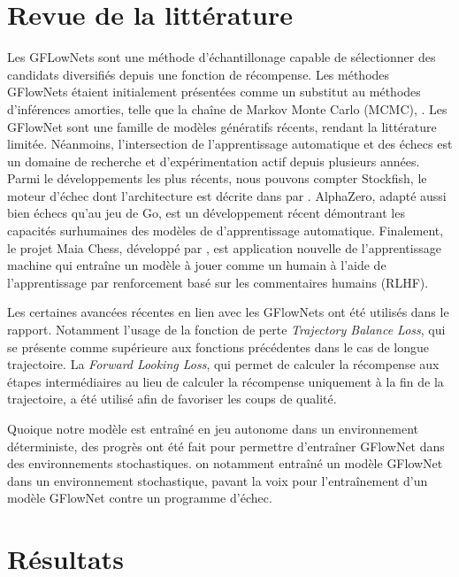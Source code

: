 \documentclass[11pt]{article}
\begin{document}
\section*{Revue de la littérature}
Les GFLowNets sont une méthode d’échantillonage capable de
sélectionner des candidats diversifiés depuis une fonction de
récompense. Les méthodes GFlowNets étaient initialement présentées
comme un substitut au méthodes d’inférences amorties, telle que la
chaîne de Markov Monte Carlo (MCMC), \cite{gflownetfoundation}. Les
GFlowNet sont une famille de modèles génératifs récents, rendant la
littérature limitée. Néanmoins, l'intersection de l'apprentissage
automatique et des échecs est un domaine de recherche et
d'expérimentation actif depuis plusieurs années. Parmi le
développements les plus récents, nous pouvons compter Stockfish, le
moteur d'échec dont l'architecture est décrite dans par
\citet{Stockfish}. AlphaZero, adapté aussi bien échecs qu'au jeu de
Go, est un développement récent démontrant les capacités surhumaines
des modèles de d'apprentissage automatique. Finalement, le projet Maia
Chess, développé par \citet{Maia}, est application nouvelle de
l'apprentissage machine qui entraîne un modèle à jouer comme un humain
à l'aide de l'apprentissage par renforcement basé sur les commentaires
humains (RLHF).

Les certaines avancées récentes en lien avec les GFlowNets ont été
utilisés dans le rapport. Notamment l'usage de la fonction de perte
\textit{Trajectory Balance Loss}, qui se présente comme supérieure aux
fonctions précédentes dans le cas de longue trajectoire. La
\textit{Forward Looking Loss}, qui permet de calculer la récompense
aux étapes intermédiaires au lieu de calculer la récompense uniquement
à la fin de la trajectoire, a été utilisé afin de favoriser les coups
de qualité.

Quoique notre modèle est entraîné en jeu autonome dans un
environnement déterministe, des progrès ont été fait pour permettre
d'entraîner GFlowNet dans des environnements
stochastiques. \citet{stochasticflow} on notamment entraîné un modèle
GFlowNet dans un environnement stochastique, pavant la voix pour
l'entraînement d'un modèle GFlowNet contre un programme d'échec.

\section*{Résultats}
\end{document}

